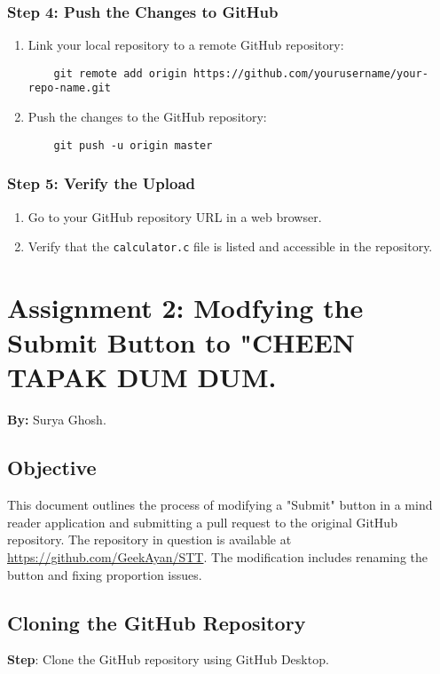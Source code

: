 \documentclass[a4paper,12pt]{article}
\begin{document}
\subsubsection{Step 4: Push the Changes to GitHub}
\begin{enumerate}
    \item Link your local repository to a remote GitHub repository:
    \begin{verbatim}
    git remote add origin https://github.com/yourusername/your-repo-name.git
    \end{verbatim}
    \item Push the changes to the GitHub repository:
    \begin{verbatim}
    git push -u origin master
    \end{verbatim}
\end{enumerate}

\subsubsection{Step 5: Verify the Upload}
\begin{enumerate}
    \item Go to your GitHub repository URL in a web browser.
    \item Verify that the \texttt{calculator.c} file is listed and accessible in the repository.
\end{enumerate}

\newpage

\section{Assignment 2: Modfying the Submit Button to "CHEEN TAPAK DUM DUM.} 

\textbf{By:} Surya Ghosh.


\subsection{Objective}This document outlines the process of modifying a "Submit" button in a mind reader application and submitting a pull request to the original GitHub repository. The repository in question is available at \url{https://github.com/GeekAyan/STT}. The modification includes renaming the button and fixing proportion issues.


\subsection{Cloning the GitHub Repository}
\textbf{Step}: Clone the GitHub repository using GitHub Desktop.
\end{document}
